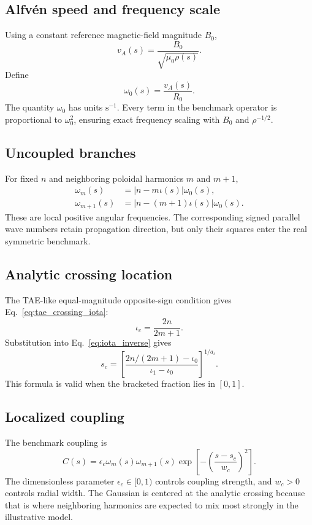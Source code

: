 \subsection{Alfv\'en speed and frequency scale}
Using a constant reference magnetic-field magnitude $B_0$,
\begin{equation}
\boxed{v_A(s)=\frac{B_0}{\sqrt{\mu_0\rho(s)}}.}
\label{eq:benchmark_va}
\end{equation}
Define
\begin{equation}
\omega_0(s)=\frac{v_A(s)}{R_0}.
\label{eq:benchmark_omega_scale}
\end{equation}
The quantity $\omega_0$ has units $\mathrm{s^{-1}}$. Every term in the benchmark operator is proportional to $\omega_0^2$, ensuring exact frequency scaling with $B_0$ and $\rho^{-1/2}$.

\subsection{Uncoupled branches}
For fixed $n$ and neighboring poloidal harmonics $m$ and $m+1$,
\begin{align}
\omega_m(s)&=|n-m\iota(s)|\omega_0(s),
\label{eq:benchmark_branch_m}\\
\omega_{m+1}(s)&=|n-(m+1)\iota(s)|\omega_0(s).
\label{eq:benchmark_branch_mp1}
\end{align}
These are local positive angular frequencies. The corresponding signed parallel wave numbers retain propagation direction, but only their squares enter the real symmetric benchmark.

\subsection{Analytic crossing location}
The TAE-like equal-magnitude opposite-sign condition gives Eq.~\eqref{eq:tae_crossing_iota}:
\begin{equation}
\iota_c=\frac{2n}{2m+1}.
\end{equation}
Substitution into Eq.~\eqref{eq:iota_inverse} gives
\begin{equation}
\boxed{
s_c=
\left[
\frac{2n/(2m+1)-\iota_0}{\iota_1-\iota_0}
\right]^{1/a_\iota}.}
\label{eq:benchmark_crossing_s}
\end{equation}
This formula is valid when the bracketed fraction lies in $[0,1]$.

\subsection{Localized coupling}
The benchmark coupling is
\begin{equation}
\boxed{
C(s)=\epsilon_c\omega_m(s)\omega_{m+1}(s)
\exp\left[-\left(\frac{s-s_c}{w_c}\right)^2\right].}
\label{eq:benchmark_coupling}
\end{equation}
The dimensionless parameter $\epsilon_c\in[0,1)$ controls coupling strength, and $w_c>0$ controls radial width. The Gaussian is centered at the analytic crossing because that is where neighboring harmonics are expected to mix most strongly in the illustrative model.

